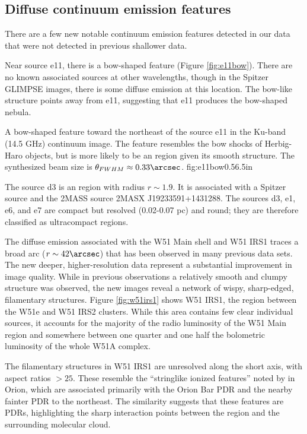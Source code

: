 




\subsection{Diffuse continuum emission features}
\label{sec:diffuseemission}
There are a few new notable continuum emission features detected in our data
that were not detected in previous shallower data.

Near source e11, there is a bow-shaped feature (Figure \ref{fig:e11bow}).
There are no known associated sources at other wavelengths, though in the
Spitzer GLIMPSE
\citep{Benjamin2003a} images, there is some diffuse emission at this location.
The bow-like structure points away from e11, suggesting that e11 produces the
bow-shaped nebula.

{A bow-shaped feature toward the northeast of the source e11 in the Ku-band
(14.5 GHz)
continuum image.  The feature resembles the bow shocks of Herbig-Haro objects,
but is more likely to be an \hii region given its smooth structure.
The synthesized beam size is
$\theta_{FWHM}\approx0.33\arcsec$.
}
{fig:e11bow}{0.5}{6.5in}

The source d3 is an \hii region with radius $r\sim1.9$\arcsec.  It is
associated with a Spitzer source and the 2MASS source 2MASX J19233591+1431288.
The sources d3, e1, e6, and e7 are compact but resolved (0.02-0.07 pc) and
round; they are therefore classified as ultracompact \hii regions.

The diffuse emission associated with the W51 Main shell and W51 IRS1 traces a broad arc
($r\sim42\arcsec$) that has been observed in many previous data sets.  The new
deeper, higher-resolution data represent a substantial improvement in image
quality.  While in previous observations a relatively smooth and clumpy
structure was observed, the new images reveal a network of wispy, sharp-edged,
filamentary structures.  Figure \ref{fig:w51irs1} shows W51 IRS1, the
region between the W51e and
W51 IRS2 clusters.  While this area contains few clear individual sources, it
accounts for the majority of the radio luminosity of the W51 Main region and
somewhere between one quarter and one half the bolometric luminosity of the
whole W51A complex.

The filamentary structures in W51 IRS1 are unresolved along the short
axis, with aspect ratios $>25$.   These resemble the ``stringlike ionized
features'' noted by \citet[][see
\url{http://images.nrao.edu/402}]{Yusef-Zadeh1990a} in Orion, which are
associated primarily with the Orion Bar PDR and the nearby fainter PDR to the
northeast.  The similarity suggests that these features are PDRs, highlighting
the sharp interaction points between the \hii region and the surrounding
molecular cloud.

